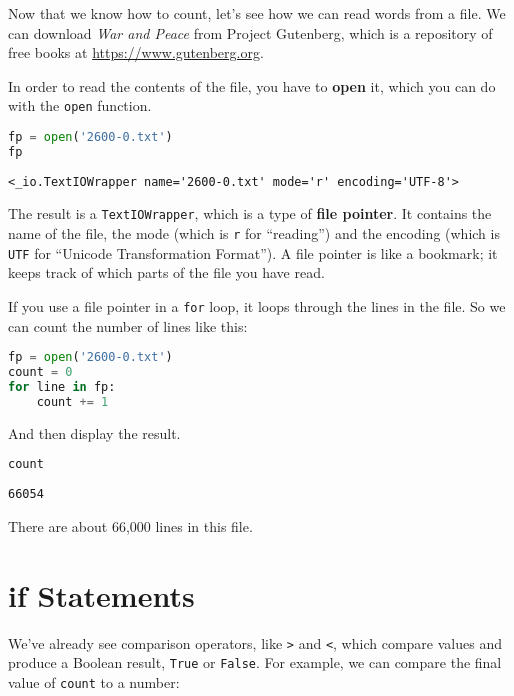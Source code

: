 Now that we know how to count, let's see how we can read words from a
file. We can download \emph{War and Peace} from Project Gutenberg, which
is a repository of free books at \url{https://www.gutenberg.org}.

In order to read the contents of the file, you have to \textbf{open} it,
which you can do with the \passthrough{\lstinline!open!} function.

\begin{lstlisting}[language=Python,style=source]
fp = open('2600-0.txt')
fp
\end{lstlisting}

\begin{lstlisting}[style=output]
<_io.TextIOWrapper name='2600-0.txt' mode='r' encoding='UTF-8'>
\end{lstlisting}

The result is a \passthrough{\lstinline!TextIOWrapper!}, which is a type
of \textbf{file pointer}. It contains the name of the file, the mode
(which is \passthrough{\lstinline!r!} for ``reading'') and the encoding
(which is \passthrough{\lstinline!UTF!} for ``Unicode Transformation
Format''). A file pointer is like a bookmark; it keeps track of which
parts of the file you have read.

If you use a file pointer in a \passthrough{\lstinline!for!} loop, it
loops through the lines in the file. So we can count the number of lines
like this:

\begin{lstlisting}[language=Python,style=source]
fp = open('2600-0.txt')
count = 0
for line in fp:
    count += 1
\end{lstlisting}

And then display the result.

\begin{lstlisting}[language=Python,style=source]
count
\end{lstlisting}

\begin{lstlisting}[style=output]
66054
\end{lstlisting}

There are about 66,000 lines in this file.

\hypertarget{if-statements}{%
\section{if Statements}\label{if-statements}}

We've already see comparison operators, like \passthrough{\lstinline!>!}
and \passthrough{\lstinline!<!}, which compare values and produce a
Boolean result, \passthrough{\lstinline!True!} or
\passthrough{\lstinline!False!}. For example, we can compare the final
value of \passthrough{\lstinline!count!} to a number:

